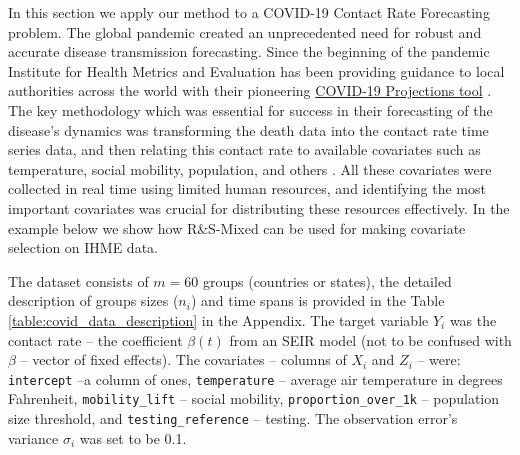 \documentclass[11pt,letterpaper]{article}
\newcommand{\ouralgo}{R\&S-Mixed }
\numberwithin{equation}{section} %
\numberwithin{figure}{section} %
\numberwithin{table}{section} %
\begin{document}
In this section we apply our method to a COVID-19 Contact Rate Forecasting problem. The global pandemic created an unprecedented need for robust and accurate disease transmission forecasting. Since the beginning of the pandemic Institute for Health Metrics and Evaluation has been providing guidance to local authorities across the world with their pioneering \href{https://covid19.healthdata.org/global?view=total-deaths&tab=trend}{COVID-19 Projections tool} \cite{IHME2020Projections}. The key methodology which was essential for success in their forecasting of the disease's dynamics was transforming the death data into the contact rate time series data, and then relating this contact rate to available covariates such as temperature, social mobility, population, and others \cite{IHME2020covidnature}. All these covariates were collected in real time using limited human resources, and identifying the most important covariates was crucial for distributing these resources effectively. In the example below we show how \ouralgo can be used for making covariate selection on IHME data. 


The dataset consists of $m=60$ groups (countries or states), the detailed description of groups sizes ($n_i$) and time spans is provided in the Table \ref{table:covid_data_description} in the Appendix. The target variable $Y_i$ was the contact rate -- the coefficient $\beta(t)$ from an SEIR model (not to be confused with $\beta$ -- vector of fixed effects). The covariates -- columns of $X_i$ and $Z_i$ -- were: \texttt{intercept} --a column of ones,  \texttt{temperature} -- average air temperature in degrees Fahrenheit, \texttt{mobility\_lift} -- social mobility, \texttt{proportion\_over\_1k} -- population size threshold, and \texttt{testing\_reference} -- testing. The observation error's variance $\sigma_i$ was set to be 0.1.
\end{document}
